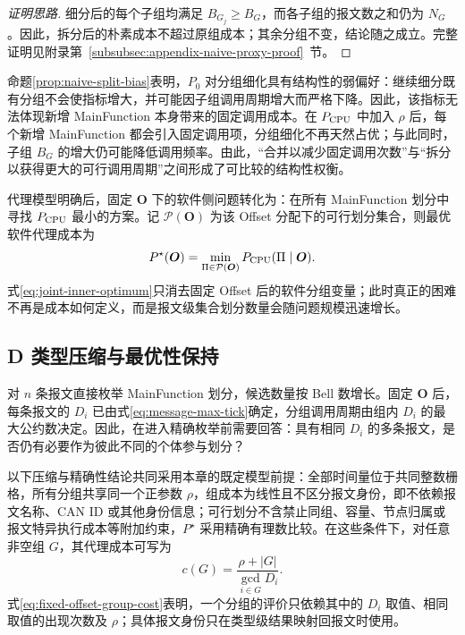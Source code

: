 \documentclass[UTF8,a4paper,twoside,zihao=-4]{ctexart}
\numberwithin{equation}{section}
\numberwithin{figure}{section}
\numberwithin{table}{section}
\theoremstyle{definition}
\numberwithin{algocf}{section}
\begin{document}
\begin{proof}[\normalfont 证明思路]
细分后的每个子组均满足 $B_{G_j}\ge B_G$，而各子组的报文数之和仍为 $N_G$。因此，拆分后的朴素成本不超过原组成本；其余分组不变，结论随之成立。完整证明见附录第~\ref{subsubsec:appendix-naive-proxy-proof}~节。
\end{proof}

命题\ref{prop:naive-split-bias}表明，$P_0$ 对分组细化具有结构性的弱偏好：继续细分既有分组不会使指标增大，并可能因子组调用周期增大而严格下降。因此，该指标无法体现新增 MainFunction 本身带来的固定调用成本。在 $P_{\rm CPU}$ 中加入 $\rho$ 后，每个新增 MainFunction 都会引入固定调用项，分组细化不再天然占优；与此同时，子组 $B_G$ 的增大仍可能降低调用频率。由此，“合并以减少固定调用次数”与“拆分以获得更大的可行调用周期”之间形成了可比较的结构性权衡。

代理模型明确后，固定 $\boldsymbol O$ 下的软件侧问题转化为：在所有 MainFunction 划分中寻找 $P_{\rm CPU}$ 最小的方案。记 $\mathcal P(\boldsymbol O)$ 为该 Offset 分配下的可行划分集合，则最优软件代理成本为
\begin{equation}
 P^\star(\boldsymbol O)
 =
 \min_{\Pi\in\mathcal P(\boldsymbol O)}
 P_{\rm CPU}(\Pi\mid\boldsymbol O).
\label{eq:joint-inner-optimum}
\end{equation}
式\eqref{eq:joint-inner-optimum}只消去固定 Offset 后的软件分组变量；此时真正的困难不再是成本如何定义，而是报文级集合划分数量会随问题规模迅速增长。

\subsection{D 类型压缩与最优性保持}
\label{subsec:d-type-compression}

对 $n$ 条报文直接枚举 MainFunction 划分，候选数量按 Bell 数增长。固定 $\boldsymbol O$ 后，每条报文的 $D_i$ 已由式\eqref{eq:message-max-tick}确定，分组调用周期由组内 $D_i$ 的最大公约数决定。因此，在进入精确枚举前需要回答：具有相同 $D_i$ 的多条报文，是否仍有必要作为彼此不同的个体参与划分？

以下压缩与精确性结论共同采用本章的既定模型前提：全部时间量位于共同整数栅格，所有分组共享同一个正参数 $\rho$，组成本为线性且不区分报文身份，即不依赖报文名称、CAN ID 或其他身份信息；可行划分不含禁止同组、容量、节点归属或报文特异执行成本等附加约束，$P^\star$ 采用精确有理数比较。在这些条件下，对任意非空组 $G$，其代理成本可写为
\begin{equation}
 c(G)
 =
 \frac{\rho+|G|}
 {\gcd_{i\in G}D_i}.
\label{eq:fixed-offset-group-cost}
\end{equation}
式\eqref{eq:fixed-offset-group-cost}表明，一个分组的评价只依赖其中的 $D_i$ 取值、相同取值的出现次数及 $\rho$；具体报文身份只在类型级结果映射回报文时使用。
\end{document}
